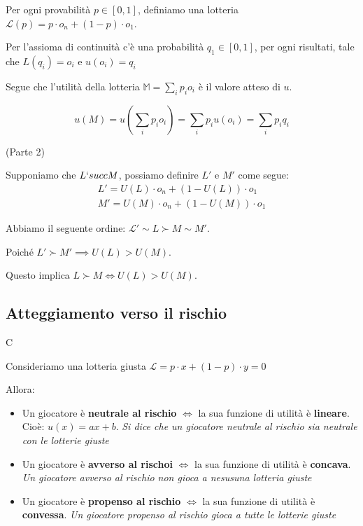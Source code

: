 Per ogni provabilità $p \in [0,1]$, definiamo una lotteria $\mathcal{L}(p) = p
    \cdot o_n + (1-p) \cdot o_1$.

Per l'assioma di continuità c'è una probabilità $q_1 \in [0,1]$, per ogni
risultati, tale che $L(q_i) = o_i$ e $u(o_i) = q_i$

Segue che l'utilità della lotteria $\mathbb{M} = \sum_i p_i o_i$ è il valore
atteso di $u$.

\[
    u(M) = u(\sum_i p_i o_i) = \sum_i p_i u(o_i) = \sum_i p_i q_i
\]

\begin{dimostrazione}(Parte 2)
\end{dimostrazione}

Supponiamo che $L `succ M$, possiamo definire $L'$ e $M'$ come segue:
\[
    \begin{aligned}
        L' = U(L) \cdot o_n + (1-U(L)) \cdot o_1 \\
        M' = U(M) \cdot o_n + (1-U(M)) \cdot o_1
    \end{aligned}
\]

Abbiamo il seguente ordine: $\mathcal{L}' \sim L \succ M \sim M'$.

Poiché $L' \succ M' \implies U(L) > U(M)$.

Questo implica $ L \succ M \iff U(L) > U(M)$.

\subsection{Atteggiamento verso il rischio}C

Consideriamo una lotteria giusta $\mathcal{L} = p \cdot x + (1-p) \cdot y = 0$

Allora:

\begin{itemize}
    \item Un giocatore è \textbf{neutrale al rischio} $\iff$ la sua funzione di utilità è
          \textbf{lineare}. Cioè: $u(x) = ax + b$. \textit{Si dice che un giocatore
              neutrale al rischio sia neutrale con le lotterie giuste }
    \item Un giocatore è \textbf{avverso al rischoi} $\iff$ la sua funzione di utilità è
          \textbf{concava}. \textit{Un giocatore avverso al rischio non gioca a nesusuna
              lotteria giuste}
    \item Un giocatore è \textbf{propenso al rischio} $\iff$ la sua funzione di utilità è
          \textbf{convessa}. \textit{Un giocatore propenso al rischio gioca a tutte le
              lotterie giuste}
\end{itemize}

